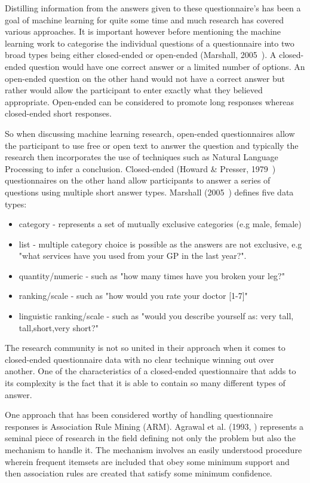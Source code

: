 Distilling information from the answers given to these questionnaire's has been a goal of machine learning for quite some time and much research has covered various approaches. It is important however before mentioning the machine learning work to categorise the individual questions of a questionnaire into two broad types being either closed-ended or open-ended (Marshall, 2005~\cite{marshall2005purpose}). A closed-ended question would have one correct answer or a limited number of options. An open-ended question on the other hand would not have a correct answer but rather would allow the participant to enter exactly what they believed appropriate. Open-ended can be considered to promote long responses whereas closed-ended short responses. 

So when discussing machine learning research, open-ended questionnaires allow the participant to use free or open text to answer the question and typically the research then incorporates the use of techniques such as Natural Language Processing to infer a conclusion. Closed-ended (Howard \& Presser, 1979~\cite{10.2307/2094521}) questionnaires on the other hand allow participants to answer a series of questions using multiple short answer types. Marshall (2005~\cite{marshall2005purpose}) defines five data types:

\begin{itemize}
    \item category - represents a set of mutually exclusive categories (e.g male, female)
    \item list - multiple category choice is possible as the answers are not exclusive, e.g "what services have you used from your GP in the last year?". 
    \item quantity/numeric - such as "how many times have you broken your leg?"
    \item ranking/scale - such as "how would you rate your doctor [1-7]"
    \item linguistic ranking/scale - such as "would you describe yourself as: very tall, tall,short,very short?"
\end{itemize}

The research community is not so united in their approach when it comes to closed-ended questionnaire data with no clear technique winning out over another. One of the characteristics of a closed-ended questionnaire that adds to its complexity is the fact that it is able to contain so many different types of answer.

One approach that has been considered worthy of handling questionnaire responses is Association Rule Mining (ARM). Agrawal et al. (1993,  \cite{agrawal1993mining}) represents a seminal piece of research in the field defining not only the problem but also the mechanism to handle it. The mechanism involves an easily understood procedure wherein frequent itemsets are included that obey some minimum support and then association rules are created that satisfy some minimum confidence. 

